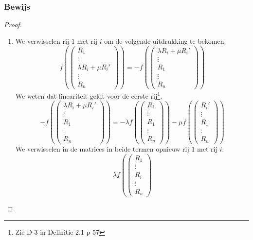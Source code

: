 \documentclass[lineaire_algebra_oplossingen.tex]{subfiles}
\begin{document}
\subsubsection*{Bewijs}
\begin{proof}
\begin{enumerate}
\item We verwisselen rij $1$ met rij $i$ om de volgende uitdrukking te bekomen.
\[
f\left(
\begin{pmatrix}
R_1 \\ \vdots \\ \lambda R_i + \mu R_i' \\ \vdots \\R_n
\end{pmatrix}
\right)
=
-
f\left(
\begin{pmatrix}
\lambda R_i + \mu R_i' \\ \vdots \\ R_1 \\ \vdots \\R_n
\end{pmatrix}
\right)
\] 
We weten dat lineariteit geldt voor de eerste rij\footnote{Zie D-3 in Definitie 2.1 p 57}.
\[
-
f\left(
\begin{pmatrix}
\lambda R_i + \mu R_i' \\ \vdots \\ R_1 \\ \vdots \\R_n
\end{pmatrix}
\right)
=
-
\lambda
f\left(
\begin{pmatrix}
R_i \\ \vdots \\ R_1\\\vdots \\R_n
\end{pmatrix}
\right)
-
\mu 
f
\left(
\begin{pmatrix}
R_i' \\ \vdots \\ R_1 \\\vdots \\R_n
\end{pmatrix}
\right)
\] 
We verwisselen in de matrices in beide termen opnieuw rij $1$ met rij $i$.
\[
\lambda
f\left(
\begin{pmatrix}
R_1 \\ \vdots \\ R_i\\\vdots \\R_n
\end{pmatrix}
\]
\end{enumerate}
\end{proof}
\end{document}
